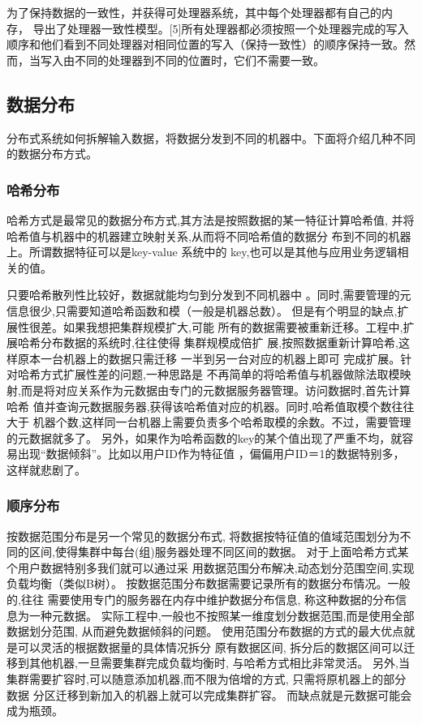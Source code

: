为了保持数据的一致性，并获得可处理器系统，其中每个处理器都有自己的内
存，
导出了处理器一致性模型。[5]所有处理器都必须按照一个处理器完成的写入
顺序和他们看到不同处理器对相同位置的写入（保持一致性）的顺序保持一致。然而，当写入由不同的处理器到不同的位置时，它们不需要一致。
\subsection{数据分布}
分布式系统如何拆解输入数据，将数据分发到不同的机器中。下面将介绍几种不同的数据分布方式。 
\subsubsection{哈希分布}
哈希方式是最常见的数据分布方式,其方法是按照数据的某一特征计算哈希值,
并将哈希值与机器中的机器建立映射关系,从而将不同哈希值的数据分
布到不同的机器上。所谓数据特征可以是key-value 系统中的 key,也可以是其他与应用业务逻辑相关的值。 

只要哈希散列性比较好，数据就能均匀到分发到不同机器中
。同时,需要管理的元信息很少,只需要知道哈希函数和模（一般是机器总数）。 
但是有个明显的缺点,扩展性很差。如果我想把集群规模扩大,可能
所有的数据需要被重新迁移。工程中,扩展哈希分布数据的系统时,往往使得
集群规模成倍扩 展,按照数据重新计算哈希,这样原本一台机器上的数据只需迁移
一半到另一台对应的机器上即可 完成扩展。针对哈希方式扩展性差的问题,一种思路是
不再简单的将哈希值与机器做除法取模映射,而是将对应关系作为元数据由专门的元数据服务器管理。访问数据时,首先计算哈希
值并查询元数据服务器,获得该哈希值对应的机器。同时,哈希值取模个数往往大于
机器个数,这样同一台机器上需要负责多个哈希取模的余数。不过，需要管理的元数据就多了。 
另外，如果作为哈希函数的key的某个值出现了严重不均，就容易出现“数据倾斜”。比如以用户ID作为特征值
，偏偏用户ID＝1的数据特别多，这样就悲剧了。 
\subsubsection{顺序分布}
按数据范围分布是另一个常见的数据分布式,
将数据按特征值的值域范围划分为不同的区间,使得集群中每台(组)服务器处理不同区间的数据。
对于上面哈希方式某个用户数据特别多我们就可以通过采
用数据范围分布解决,动态划分范围空间,实现负载均衡（类似B树）。 
按数据范围分布数据需要记录所有的数据分布情况。一般的,往往
需要使用专门的服务器在内存中维护数据分布信息, 称这种数据的分布信息为一种元数据。 
实际工程中,一般也不按照某一维度划分数据范围,而是使用全部数据划分范围,
从而避免数据倾斜的问题。 
使用范围分布数据的方式的最大优点就是可以灵活的根据数据量的具体情况拆分
原有数据区间, 拆分后的数据区间可以迁移到其他机器,一旦需要集群完成负载均衡时,
与哈希方式相比非常灵活。 另外,当集群需要扩容时,可以随意添加机器,而不限为倍增的方式,
只需将原机器上的部分数据 分区迁移到新加入的机器上就可以完成集群扩容。
而缺点就是元数据可能会成为瓶颈。 
